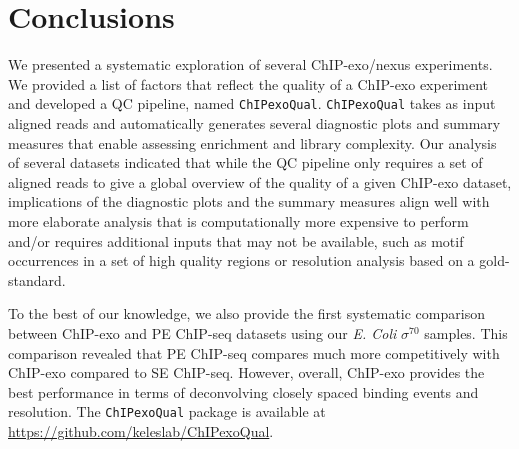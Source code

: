 \documentclass{bmcart}
\newcommand{\pname}[1]{\texttt{ChIPexoQual}}
\newcommand{\sig}{\sigma^{70}}
\begin{document}
\section*{Conclusions}
\label{sec:conc}

We presented a systematic exploration of several ChIP-exo/nexus experiments. We
provided a list of factors that reflect the quality of a ChIP-exo
experiment and developed a QC pipeline, named \pname{}. \pname{} takes as input aligned reads and automatically generates several diagnostic plots and summary measures that enable assessing enrichment and library complexity.
Our analysis of several datasets indicated that
while the QC pipeline only requires a set of aligned reads
to give a global overview of the quality of a given ChIP-exo dataset, 
implications of the diagnostic plots and the summary measures align well
with more elaborate analysis that is computationally more
expensive to perform and/or requires additional inputs that may not be
available, such as motif occurrences in a set of high quality regions or
resolution analysis based on a gold-standard.


To the best of our knowledge, we also provide the first systematic
comparison between ChIP-exo and PE ChIP-seq datasets using our
\textit{E. Coli} $\sig$ samples.  This comparison revealed that PE
ChIP-seq compares much more competitively with ChIP-exo compared to SE
ChIP-seq. However, overall, ChIP-exo provides the best performance in
terms of deconvolving closely spaced binding events and resolution.
The \pname{} package is available at
\url{https://github.com/keleslab/ChIPexoQual}.
\end{document}
